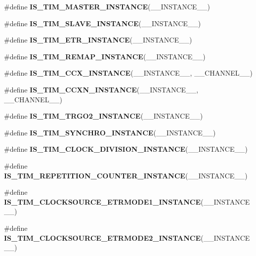 \begin{DoxyCompactItemize}
\item 
\#define {\bfseries I\+S\+\_\+\+T\+I\+M\+\_\+\+M\+A\+S\+T\+E\+R\+\_\+\+I\+N\+S\+T\+A\+N\+CE}(\+\_\+\+\_\+\+I\+N\+S\+T\+A\+N\+C\+E\+\_\+\+\_\+)
\item 
\#define {\bfseries I\+S\+\_\+\+T\+I\+M\+\_\+\+S\+L\+A\+V\+E\+\_\+\+I\+N\+S\+T\+A\+N\+CE}(\+\_\+\+\_\+\+I\+N\+S\+T\+A\+N\+C\+E\+\_\+\+\_\+)
\item 
\#define {\bfseries I\+S\+\_\+\+T\+I\+M\+\_\+\+E\+T\+R\+\_\+\+I\+N\+S\+T\+A\+N\+CE}(\+\_\+\+\_\+\+I\+N\+S\+T\+A\+N\+C\+E\+\_\+\+\_\+)
\item 
\#define {\bfseries I\+S\+\_\+\+T\+I\+M\+\_\+\+R\+E\+M\+A\+P\+\_\+\+I\+N\+S\+T\+A\+N\+CE}(\+\_\+\+\_\+\+I\+N\+S\+T\+A\+N\+C\+E\+\_\+\+\_\+)
\item 
\mbox{\label{group___exported__macros_gaec881b6e74e42d4ca9e404d5b2c79e84}} 
\#define {\bfseries I\+S\+\_\+\+T\+I\+M\+\_\+\+C\+C\+X\+\_\+\+I\+N\+S\+T\+A\+N\+CE}(\+\_\+\+\_\+\+I\+N\+S\+T\+A\+N\+C\+E\+\_\+\+\_\+,  \+\_\+\+\_\+\+C\+H\+A\+N\+N\+E\+L\+\_\+\+\_\+)
\item 
\#define {\bfseries I\+S\+\_\+\+T\+I\+M\+\_\+\+C\+C\+X\+N\+\_\+\+I\+N\+S\+T\+A\+N\+CE}(\+\_\+\+\_\+\+I\+N\+S\+T\+A\+N\+C\+E\+\_\+\+\_\+,  \+\_\+\+\_\+\+C\+H\+A\+N\+N\+E\+L\+\_\+\+\_\+)
\item 
\#define {\bfseries I\+S\+\_\+\+T\+I\+M\+\_\+\+T\+R\+G\+O2\+\_\+\+I\+N\+S\+T\+A\+N\+CE}(\+\_\+\+\_\+\+I\+N\+S\+T\+A\+N\+C\+E\+\_\+\+\_\+)
\item 
\#define {\bfseries I\+S\+\_\+\+T\+I\+M\+\_\+\+S\+Y\+N\+C\+H\+R\+O\+\_\+\+I\+N\+S\+T\+A\+N\+CE}(\+\_\+\+\_\+\+I\+N\+S\+T\+A\+N\+C\+E\+\_\+\+\_\+)
\item 
\#define {\bfseries I\+S\+\_\+\+T\+I\+M\+\_\+\+C\+L\+O\+C\+K\+\_\+\+D\+I\+V\+I\+S\+I\+O\+N\+\_\+\+I\+N\+S\+T\+A\+N\+CE}(\+\_\+\+\_\+\+I\+N\+S\+T\+A\+N\+C\+E\+\_\+\+\_\+)
\item 
\#define {\bfseries I\+S\+\_\+\+T\+I\+M\+\_\+\+R\+E\+P\+E\+T\+I\+T\+I\+O\+N\+\_\+\+C\+O\+U\+N\+T\+E\+R\+\_\+\+I\+N\+S\+T\+A\+N\+CE}(\+\_\+\+\_\+\+I\+N\+S\+T\+A\+N\+C\+E\+\_\+\+\_\+)
\item 
\#define {\bfseries I\+S\+\_\+\+T\+I\+M\+\_\+\+C\+L\+O\+C\+K\+S\+O\+U\+R\+C\+E\+\_\+\+E\+T\+R\+M\+O\+D\+E1\+\_\+\+I\+N\+S\+T\+A\+N\+CE}(\+\_\+\+\_\+\+I\+N\+S\+T\+A\+N\+C\+E\+\_\+\+\_\+)
\item 
\#define {\bfseries I\+S\+\_\+\+T\+I\+M\+\_\+\+C\+L\+O\+C\+K\+S\+O\+U\+R\+C\+E\+\_\+\+E\+T\+R\+M\+O\+D\+E2\+\_\+\+I\+N\+S\+T\+A\+N\+CE}(\+\_\+\+\_\+\+I\+N\+S\+T\+A\+N\+C\+E\+\_\+\+\_\+)

\end{DoxyCompactItemize}
